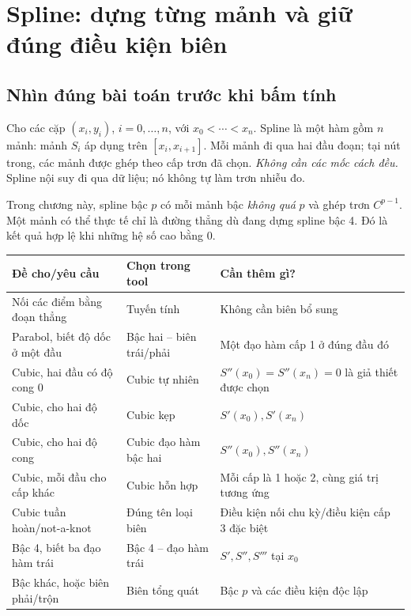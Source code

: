\chapter{Spline: dựng từng mảnh và giữ đúng điều kiện biên}
\label{ch:spline}


\section{Nhìn đúng bài toán trước khi bấm tính}
\label{sec:spline-map}
Cho các cặp $(x_i,y_i)$, $i=0,\ldots,n$, với $x_0<\cdots<x_n$.
Spline là một hàm gồm $n$ mảnh: mảnh $S_i$ áp dụng trên $[x_i,x_{i+1}]$.
Mỗi mảnh đi qua hai đầu đoạn; tại nút trong, các mảnh được ghép theo cấp trơn đã chọn.
\emph{Không cần các mốc cách đều.} Spline nội suy đi qua dữ liệu; nó không tự làm trơn nhiễu đo.

Trong chương này, spline bậc $p$ có mỗi mảnh bậc \emph{không quá} $p$ và ghép trơn
$C^{p-1}$. Một mảnh có thể thực tế chỉ là đường thẳng dù đang dựng spline bậc 4.
Đó là kết quả hợp lệ khi những hệ số cao bằng 0.

\begin{center}\small
\begin{tabular}{p{.28\linewidth}p{.32\linewidth}p{.31\linewidth}}
\toprule
Đề cho/yêu cầu & Chọn trong tool & Cần thêm gì?\\ \midrule
Nối các điểm bằng đoạn thẳng & Tuyến tính & Không cần biên bổ sung\\
Parabol, biết độ dốc ở một đầu & Bậc hai -- biên trái/phải & Một đạo hàm cấp 1 ở đúng đầu đó\\
Cubic, hai đầu có độ cong 0 & Cubic tự nhiên & $S''(x_0)=S''(x_n)=0$ là giả thiết được chọn\\
Cubic, cho hai độ dốc & Cubic kẹp & $S'(x_0),S'(x_n)$\\
Cubic, cho hai độ cong & Cubic đạo hàm bậc hai & $S''(x_0),S''(x_n)$\\
Cubic, mỗi đầu cho cấp khác & Cubic hỗn hợp & Mỗi cấp là 1 hoặc 2, cùng giá trị tương ứng\\
Cubic tuần hoàn/not-a-knot & Đúng tên loại biên & Điều kiện nối chu kỳ/điều kiện cấp 3 đặc biệt\\
Bậc 4, biết ba đạo hàm trái & Bậc 4 -- đạo hàm trái & $S',S'',S'''$ tại $x_0$\\
Bậc khác, hoặc biên phải/trộn & Biên tổng quát & Bậc $p$ và các điều kiện độc lập\\
\bottomrule
\end{tabular}\end{center}

